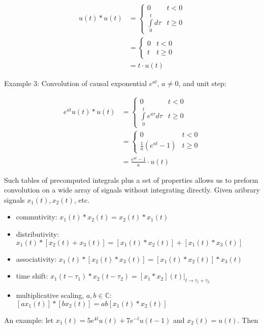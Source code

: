 \documentclass{article}
\begin{document}
\begin{align}
u(t) * u(t) &= \left\{\begin{array}{cc}
  0 & t < 0\\
  \int\limits_{0}^{t} d\tau & t \geq 0
\end{array}\right.\\
&= \left\{\begin{array}{cc}
  0 & t < 0\\
  t & t \geq 0
\end{array}\right.\\
&= t\cdot u(t)
\end{align}

Example 3: Convolution of causal exponential $e^{a t}$, $a \neq 0$, and unit step:

\begin{align}
e^{a t}u(t) * u(t) &= \left\{\begin{array}{cc}
  0 & t < 0\\
  \int\limits_{0}^{t} e^{a \tau}d\tau & t \geq 0
\end{array}\right.\\
&= \left\{\begin{array}{cc}
  0 & t < 0\\
  \frac{1}{a}\left(e^{at} - 1\right)  & t \geq 0
\end{array}\right.\\
&= \frac{e^{at} - 1}{a}\cdot u(t)
\end{align}

Such tables of precomputed integrals plus a set of properties allows us to preform convolution on a wide array of signals without integrating directly. Given aribrary signals $x_1(t), x_2(t)$, etc.

\begin{itemize}
\item commutivity: $x_1(t) * x_2(t) = x_2(t) * x_1(t)$
\item distributivity: $x_1(t) * [x_2(t) + x_3(t)] = [x_1(t)*x_2(t)] + [x_1(t)*x_3(t)]$
\item associativity: $x_1(t) * [x_2(t) * x_3(t)] = [x_1(t)*x_2(t)] * x_3(t)$
\item time shift: $x_1(t-\tau_1)*x_2(t-\tau_2) = \left. [x_1 * x_2](t) \right|_{t\rightarrow \tau_1 + \tau_2}$
\item multiplicative scaling, $a,b\in\mathbb{C}$: $[ax_1(t)]*[bx_2(t)] = ab[x_1(t) * x_2(t)]$ 
\end{itemize}

An example: let $x_1(t) = 5e^{4t}u(t) + 7e^{-t}u(t-1)$ and $x_2(t) = u(t)$. Then
\end{document}
